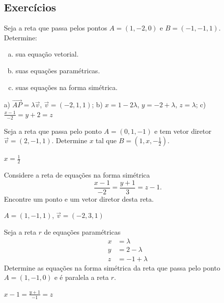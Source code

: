 \subsection*{Exercícios}

\begin{exer}
  Seja a reta que passa pelos pontos $A=(1,-2,0)$ e $B=(-1,-1,1)$. Determine:
  \begin{enumerate}[a)]
  \item sua equação vetorial.
  \item suas equações paramétricas.
  \item suas equações na forma simétrica.
  \end{enumerate}
\end{exer}
\begin{resp}
  a) $\overrightarrow{AP}=\lambda\vec{v}$, $\vec{v}=(-2,1,1)$; b) $x=1-2\lambda$, $y=-2+\lambda$, $z=\lambda$; c) $\frac{x-1}{-2}=y+2=z$
\end{resp}

\begin{exer}
  Seja a reta que passa pelo ponto $A=(0,1,-1)$ e tem vetor diretor $\vec{v}=(2,-1,1)$. Determine $x$ tal que $B=(1,x,-\frac{1}{2})$.
\end{exer}
\begin{resp}
  $x=\frac{1}{2}$
\end{resp}

\begin{exer}
  Considere a reta de equações na forma simétrica
  \begin{equation}
    \frac{x-1}{-2}=\frac{y+1}{3}=z-1.
  \end{equation}
  Encontre um ponto e um vetor diretor desta reta.
\end{exer}
\begin{resp}
  $A=(1,-1,1)$, $\vec{v}=(-2,3,1)$
\end{resp}

\begin{exer}
  Seja a reta $r$ de equações paramétricas
  \begin{align}
    x &= \lambda\\
    y &= 2-\lambda\\
    z &= -1+\lambda
  \end{align}
  Determine as equações na forma simétrica da reta que passa pelo ponto $A=(1,-1,0)$ e é paralela a reta $r$.
\end{exer}
\begin{resp}
  $x-1=\frac{y+1}{-1}=z$
\end{resp}

